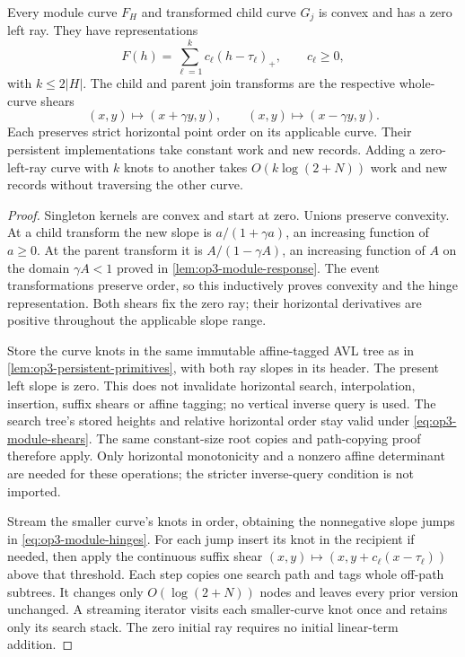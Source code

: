\begin{lemma}
\label{lem:op3-module-convex-shears}
Every module curve $F_H$ and transformed child curve $G_j$ is convex and
has a zero left ray. They have representations
\begin{equation}
 F(h)=\sum_{\ell=1}^{k}c_\ell(h-\tau_\ell)_+,
 \qquad c_\ell\geq0,
 \label{eq:op3-module-hinges}
\end{equation}
with $k\leq2|H|$. The child and parent join transforms are the respective
whole-curve shears
\begin{equation}
 (x,y)\longmapsto(x+\gamma y,y),\qquad
 (x,y)\longmapsto(x-\gamma y,y).
 \label{eq:op3-module-shears}
\end{equation}
Each preserves strict horizontal point order on its applicable curve.
Their persistent implementations take constant work and new records.
Adding a zero-left-ray curve with $k$ knots to another takes
$O(k\log(2+N))$ work and new records without traversing the other curve.
\end{lemma}
\begin{proof}
Singleton kernels are convex and start at zero. Unions preserve convexity.
At a child transform the new slope is $a/(1+\gamma a)$, an increasing
function of $a\geq0$. At the parent transform it is $A/(1-\gamma A)$,
an increasing function of $A$ on the domain
$\gamma A<1$ proved in \cref{lem:op3-module-response}. The event
transformations preserve order, so this inductively proves convexity and
the hinge representation. Both shears fix the zero ray; their horizontal
derivatives are positive throughout the applicable slope range.

Store the curve knots in the same immutable affine-tagged AVL tree as in
\cref{lem:op3-persistent-primitives}, with both ray slopes in its header.
The present left slope is zero. This does not invalidate horizontal
search, interpolation, insertion, suffix shears or affine tagging; no
vertical inverse query is used. The search tree's stored heights and
relative horizontal order stay valid under \cref{eq:op3-module-shears}.
The same constant-size root copies and path-copying proof therefore apply.
Only horizontal monotonicity and a nonzero affine determinant are needed
for these operations; the stricter inverse-query condition is not imported.

Stream the smaller curve's knots in order, obtaining the nonnegative
slope jumps in \cref{eq:op3-module-hinges}. For each jump insert its knot
in the recipient if needed, then apply the continuous suffix shear
$(x,y)\mapsto(x,y+c_\ell(x-\tau_\ell))$ above that threshold. Each step
copies one search path and tags whole off-path subtrees. It changes only
$O(\log(2+N))$ nodes and leaves every prior version unchanged. A streaming
iterator visits each smaller-curve knot once and retains only its search
stack. The zero initial ray requires no initial linear-term addition.
\end{proof}

